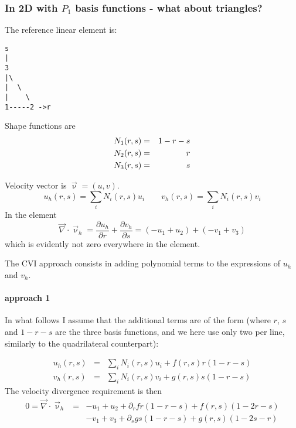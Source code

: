 \subsubsection{In 2D with $P_1$ basis functions - what about triangles?}


The reference linear element is: 
\begin{verbatim}
s
|
3
|\
|  \
|    \
1-----2 ->r
\end{verbatim}

Shape functions are 
\begin{eqnarray}
N_1(r,s) &=& 1-r-s \nonumber\\
N_2(r,s) &=& r \nonumber\\
N_3(r,s) &=& s 
\end{eqnarray}

Velocity vector is $\vec\upnu=(u,v)$. 
\[
u_h(r,s)=\sum_i N_i(r,s) u_i
\qquad
v_h(r,s)=\sum_i N_i(r,s) v_i
\]
In the element
\[
\vec\nabla\cdot\vec\upnu_h = 
\frac{\partial u_h}{\partial r}
+
\frac{\partial v_h}{\partial s}
=(-u_1+u_2)+(-v_1+v_3)
\]
which is evidently not zero everywhere in the element.

The CVI approach consists in adding polynomial terms to the expressions of $u_h$ and $v_h$.

\paragraph{approach 1}
In what follows I assume that the additional terms are of the form (where $r$, $s$ and $1-r-s$ are the three basis functions, and we here use only two per line, similarly to the quadrilateral counterpart):

\begin{eqnarray}
u_h(r,s)&=&\sum_i N_i(r,s) u_i + f(r,s) r(1-r-s) \\
v_h(r,s)&=&\sum_i N_i(r,s) v_i + g(r,s) s(1-r-s) 
\end{eqnarray}
The velocity divergence requirement is then
\begin{eqnarray}
0=\vec\nabla\cdot\vec\upnu_h 
&=& 
  -u_1+u_2 + \partial_r f r(1-r-s) + f(r,s)(1-2r-s) \\
&&-v_1+v_3 + \partial_s g s(1-r-s) + g(r,s)(1-2s-r)
\end{eqnarray}

